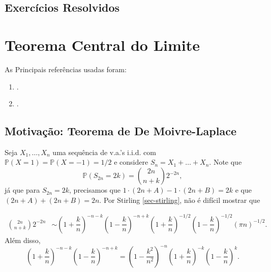 \documentclass[12pt,a4paper,oneside]{book}
\theoremstyle{definition}
\theoremstyle{remark}
\numberwithin{equation}{section}
\newcommand{\pr}{\mathbb{P}}
\begin{document}
\newpage
\section{Exercícios Resolvidos}







\chapter{Teorema Central do Limite }

\begin{tcolorbox}[colback = white]
As Principais referências usadas foram:
\begin{enumerate}
\item \cite{durrett}.
\item \cite{stroock}.
\end{enumerate}
\end{tcolorbox}



\section{Motivação: Teorema de De Moivre-Laplace }

Seja $X_1,\dots,X_n$ uma sequência de v.a.'s i.i.d. com $\pr(X=1)= \pr(X=-1)=1/2$ e considere $S_n = X_1+\dots+X_n.$ Note que
$$\pr(S_{2n} = 2k) = {2n\choose n+k}2^{-2n},$$
já que para $S_{2n}=2k$, precisamos que $1\cdot(2n + A) -1\cdot(2n+B) =2k$ e que
$(2n+A)+(2n+B)= 2n$. Por Stirling \ref{sec-stirling}, não é difícil mostrar que


\begin{align*}
{2n\choose n+k}2^{-2n} &\sim \left( 1+\dfrac{k}{n} \right)^{-n-k}\left( 1-\dfrac{k}{n} \right)^{-n+k}\left( 1+\dfrac{k}{n} \right)^{-1/2}\left( 1-\dfrac{k}{n} \right)^{-1/2}(\pi n)^{-1/2}.
\end{align*}
Além disso,
$$ \left( 1+\dfrac{k}{n} \right)^{-n-k}\left( 1-\dfrac{k}{n} \right)^{-n+k} =  \left( 1-\dfrac{k^2}{n^2} \right)^{-n}\left( 1+\dfrac{k}{n} \right)^{-k}\left( 1-\dfrac{k}{n} \right)^{k}.$$
\end{document}
